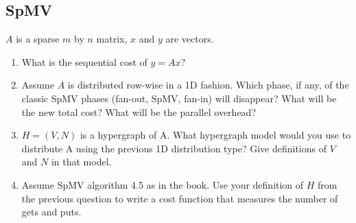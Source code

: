 \documentclass[../main.tex]{subfiles}
\begin{document}
\subsection{SpMV}
\begin{question}
$A$ is a sparse $m$ by $n$ matrix, $x$ and $y$ are vectors.
\begin{enumerate}
	\item What is the sequential cost of $y=Ax$?
	\item Assume $A$ is distributed row-wise in a 1D fashion. Which phase, if any, of the classic SpMV phases (fan-out, SpMV, fan-in) will disappear? What will be the new total cost? What will be the parallel overhead?
	\item $H=(V,N)$ is a hypergraph of A. What hypergraph model would you use to distribute A using the previous 1D distribution type? Give definitions of $V$ and $N$ in that model.
	\item Assume SpMV algorithm 4.5 as in the book. Use your definition of $H$ from the previous question to write a cost function that measures the number of gets and puts.
\end{enumerate}
\end{question}
\end{document}
